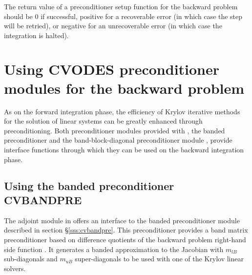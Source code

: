 {
  The return value of a preconditioner setup function for the backward
  problem should be $0$ if successful, 
  positive for a recoverable error (in which case the step will be retried),     
  or negative for an unrecoverable error (in which case the integration is halted).
}
{}


\section{Using CVODES preconditioner modules for the backward problem}

As on the forward integration phase, the efficiency of Krylov iterative methods 
for the solution of linear systems can be greatly enhanced through preconditioning.
Both preconditioner modules provided with {\sundials}, the banded
preconditioner {\cvbandpre} and the band-block-diagonal preconditioner module {\cvbbdpre},
provide interface functions through which they can be used on the backward integration phase.


\subsection{Using the banded preconditioner CVBANDPRE}

The adjoint module in {\cvodes} offers an interface to the banded 
preconditioner module {\cvbandpre} described in section \S\ref{sss:cvbandpre}.
This preconditioner provides a band matrix preconditioner based on difference
quotients of the backward problem right-hand side function . It generates
a banded approximation to the Jacobian with $m_{lB}$ sub-diagonals and $m_{uB}$
super-diagonals to be used with one of the Krylov linear solvers.

